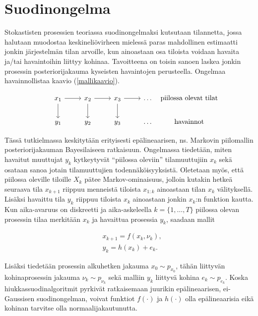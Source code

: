 \documentclass[
  12pt,
  a4paper, twoside]{book}
\begin{document}
\section{Suodinongelma}

Stokastisten prosessien teoriassa suodinongelmaksi kutsutaan tilannetta, jossa halutaan muodostaa keskineliövirheen mielessä paras mahdollinen estimaatti jonkin järjestelmän tilan arvoille, kun ainoastaan osa tiloista voidaan havaita ja/tai havaintoihin liittyy kohinaa. Tavoitteena on toisin sanoen laskea jonkin prosessin posteriorijakauma kyseisten havaintojen perusteella. Ongelmaa havainnollistaa kaavio (\ref{mallikaavio}).

\begin{equation}\label{mallikaavio}
\begin{tikzcd}
x_1 \arrow[d] \arrow[r] & x_2 \arrow[d] \arrow[r] & x_3 \arrow[d] \arrow[r] & \ldots & \makebox[\widthof{$ \text{havainnot}$}]{$\text{piilossa olevat tilat}$} \\
y_1  & y_2  & y_3  & \ldots & \makebox[\widthof{$ \text{havainnot}$}]{$\text{havainnot}$}
\end{tikzcd}
\end{equation}

Tässä tutkielmassa keskitytään erityisesti epälineaarisen, ns. Markovin piilomallin posteriorijakauman Bayesilaiseen ratkaisuun. Ongelmassa tiedetään, miten havaitut muuttujat \(y_k\) kytkeytyvät ``piilossa oleviin'' tilamuuttujiin \(x_k\) sekä osataan sanoa jotain tilamuuttujien todennäköisyyksistä. Oletetaan myös, että piilossa oleville tiloille \(X_k\) pätee Markov-ominaisuus, jolloin kutakin hetkeä seuraava tila \(x_{k+1}\) riippuu menneistä tiloista \(x_{1:k}\) ainoastaan tilan \(x_k\) välityksellä. Lisäksi havaittu tila \(y_k\) riippuu tiloista \(x_{k}\) ainoastaan jonkin \(x_k\):n funktion kautta. Kun aika-avaruus on diskreetti ja aika-askeleella \(k=\{1,\ldots,T\}\) piilossa olevan prosessin tilaa merkitään \(x_k\) ja havaittua prosessia \(y_k\), saadaan mallit

\begin{align}
&\label{malli-1} x_{k+1} = f(x_k, \nu_k),\\
&\label{malli-2} y_{k} = h(x_k)+e_k.
\end{align}

Lisäksi tiedetään prosessin alkuhetken jakauma \(x_0 \sim p_{x_{0}}\), tähän liittyvän kohinaprosessin jakauma \(\nu_k \sim p_{\nu_{k}}\) sekä malliin \(y_k\) liittyvä kohina \(e_k \sim p_{e_k}\). Koska hiukkassuodinalgoritmit pyrkivät ratkaisemaan juurikin epälineaarisen, ei-Gaussisen suodinongelman, voivat funktiot \(f(\cdot)\) ja \(h(\cdot)\) olla epälineaarisia eikä kohinan tarvitse olla normaalijakautunutta.
\end{document}
